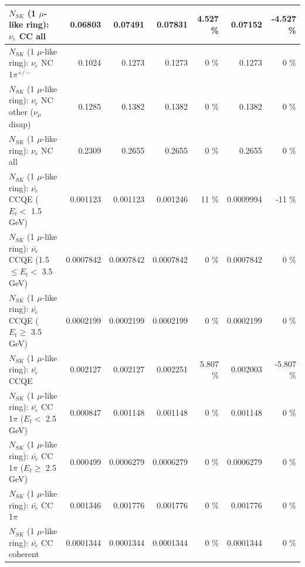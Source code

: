 \begin{table}
\begin{tabular}{| l | r | r | r  r | r  r |}
                                  $N_{SK}$ (1 $\mu$-like ring): $\nu_{e}$ CC all &         0.06803 &         0.07491 &         0.07831 &    4.527 \%  &         0.07152 &   -4.527 \%  \\ 
\hline
                           $N_{SK}$ (1 $\mu$-like ring): $\nu_e$ NC 1$\pi^{+/-}$ &          0.1024 &          0.1273 &          0.1273 &        0 \%  &          0.1273 &        0 \%  \\ 
                $N_{SK}$ (1 $\mu$-like ring): $\nu_e$ NC other ($\nu_\mu$ disap) &          0.1285 &          0.1382 &          0.1382 &        0 \%  &          0.1382 &        0 \%  \\ 
                                  $N_{SK}$ (1 $\mu$-like ring): $\nu_{e}$ NC all &          0.2309 &          0.2655 &          0.2655 &        0 \%  &          0.2655 &        0 \%  \\ 
\hline
\hline
\hline
            $N_{SK}$ (1 $\mu$-like ring): $\bar{\nu_e}$ CCQE ($E_{t} <$ 1.5 GeV) &        0.001123 &        0.001123 &        0.001246 &       11 \%  &       0.0009994 &      -11 \%  \\ 
   $N_{SK}$ (1 $\mu$-like ring): $\bar{\nu_e}$ CCQE (1.5 $\leq E_{t} <$ 3.5 GeV) &       0.0007842 &       0.0007842 &       0.0007842 &        0 \%  &       0.0007842 &        0 \%  \\ 
         $N_{SK}$ (1 $\mu$-like ring): $\bar{\nu_e}$ CCQE ($E_{t} \geq$ 3.5 GeV) &       0.0002199 &       0.0002199 &       0.0002199 &        0 \%  &       0.0002199 &        0 \%  \\ 
\hline
                                $N_{SK}$ (1 $\mu$-like ring): $\bar{\nu_e}$ CCQE &        0.002127 &        0.002127 &        0.002251 &    5.807 \%  &        0.002003 &   -5.807 \%  \\ 
\hline
       $N_{SK}$ (1 $\mu$-like ring): $\bar{\nu_e}$ CC 1$\pi$ ($E_{t} <$ 2.5 GeV) &        0.000847 &        0.001148 &        0.001148 &        0 \%  &        0.001148 &        0 \%  \\ 
    $N_{SK}$ (1 $\mu$-like ring): $\bar{\nu_e}$ CC 1$\pi$ ($E_{t} \geq$ 2.5 GeV) &        0.000499 &       0.0006279 &       0.0006279 &        0 \%  &       0.0006279 &        0 \%  \\ 
\hline
                           $N_{SK}$ (1 $\mu$-like ring): $\bar{\nu_e}$ CC 1$\pi$ &        0.001346 &        0.001776 &        0.001776 &        0 \%  &        0.001776 &        0 \%  \\ 
                         $N_{SK}$ (1 $\mu$-like ring): $\bar{\nu_e}$ CC coherent &       0.0001344 &       0.0001344 &       0.0001344 &        0 \%  &       0.0001344 &        0 \%  \\ 

\end{tabular}
\end{table}
